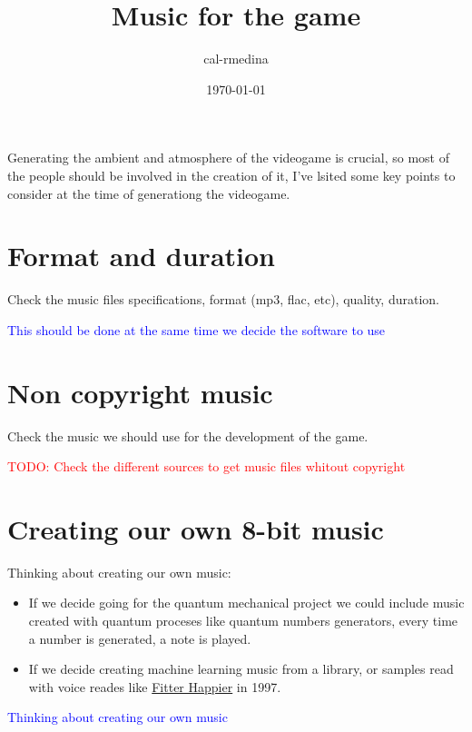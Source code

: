 \documentclass{article}
\title{Music for the game}
\date{\today}
\author{cal-rmedina}
\begin{document}
  \maketitle

Generating the ambient and atmosphere of the videogame is crucial, so most of
the people should be involved in the creation of it, I've lsited some key
points to consider at the time of generationg the videogame.

\section{Format and duration}

Check the music files specifications, format (mp3, flac, etc), quality, duration.

\textcolor{blue}{This should be done at the same time we decide the software to use}

\section{Non copyright music}

Check the music we should use for the development of the game.

\textcolor{red}{TODO: Check the different sources to get music files whitout copyright}

\section{Creating our own 8-bit music}

Thinking about creating our own music:
\begin{itemize}
  \item If we decide going for the quantum mechanical project we could include
music created with quantum proceses like quantum numbers generators, every time
a number is generated, a note is played.
  \item If we decide creating machine learning music from a library, or samples read with voice reades like \href{https://www.youtube.com/watch?v=O4SzvsMFaek}{Fitter Happier} in 1997.

\end{itemize}

\textcolor{blue}{Thinking about creating our own music}
\end{document}
